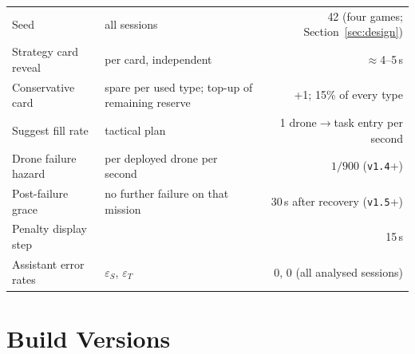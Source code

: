 \documentclass[10pt]{article}
\theoremstyle{definition}
\begin{document}
\begin{table}[htbp]
\begin{tabular}{llr}
Seed & all sessions & 42 (four games; Section~\ref{sec:design}) \\
Strategy card reveal & per card, independent & $\approx$4--5\,s \\
Conservative card & spare per used type; top-up of remaining reserve & +1; 15\% of every type \\
Suggest fill rate & tactical plan & 1 drone$\rightarrow$task entry per second \\
Drone failure hazard & per deployed drone per second & $1/900$ (\texttt{v1.4}+) \\
Post-failure grace & no further failure on that mission & 30\,s after recovery (\texttt{v1.5}+) \\
Penalty display step & & 15\,s \\
Assistant error rates & $\varepsilon_S$, $\varepsilon_T$ & 0, 0 (all analysed sessions) \\
\bottomrule
\end{tabular}
\end{table}

\section{Build Versions}\label{app:builds}
\end{document}
